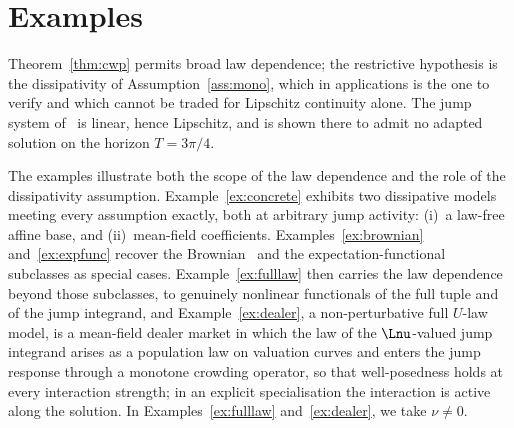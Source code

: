 \section{Examples}\label{sec:examples}

Theorem~\ref{thm:cwp} permits broad law dependence; the restrictive hypothesis is the
dissipativity of Assumption~\ref{ass:mono}, which in applications is the one to verify
and which cannot be traded for Lipschitz continuity alone. The jump system
of~\cite[Example~3.2]{LiMin} is linear, hence Lipschitz, and is shown there to admit no
adapted solution on the horizon $T=3\pi/4$.

The examples illustrate both the scope of the law dependence and the role of the
dissipativity assumption. Example~\ref{ex:concrete} exhibits two dissipative models
meeting every assumption exactly, both at arbitrary jump activity: (i)~a law-free affine base,
and (ii)~mean-field coefficients.
Examples~\ref{ex:brownian} and~\ref{ex:expfunc} recover the Brownian~\cite{BYZ} and the
expectation-functional~\cite{LiMin} subclasses as special cases.
Example~\ref{ex:fulllaw} then carries the law dependence beyond those subclasses, to genuinely
nonlinear functionals of the full tuple and of the jump integrand, and
Example~\ref{ex:dealer}, a non-perturbative full $U$-law model, is a
mean-field dealer market in which the law of the $\Lnu$-valued jump integrand arises as a
population law on valuation curves and enters the jump response through a monotone
crowding operator, so that well-posedness holds at every interaction strength; in an
explicit specialisation the interaction is active along the solution.
In Examples~\ref{ex:fulllaw} and~\ref{ex:dealer}, we take $\nu\ne0$.

